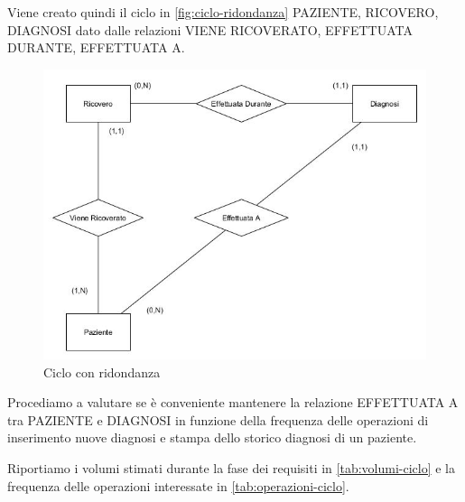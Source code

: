 \documentclass{article}
\begin{document}
Viene creato quindi il ciclo in \autoref{fig:ciclo-ridondanza} PAZIENTE, RICOVERO, DIAGNOSI dato dalle relazioni VIENE RICOVERATO, EFFETTUATA DURANTE, EFFETTUATA A.

\begin{figure}[H] %
      \centering
      \includegraphics[width=\linewidth]{schema3.jpg}
      \caption{Ciclo con ridondanza}
      \label{fig:ciclo-ridondanza}
    \end{figure}
Procediamo a valutare se è conveniente mantenere la relazione EFFETTUATA A tra PAZIENTE e DIAGNOSI in funzione della frequenza delle operazioni di inserimento nuove diagnosi e stampa dello storico diagnosi di un paziente.


Riportiamo i volumi stimati durante la fase dei requisiti in \autoref{tab:volumi-ciclo} e la frequenza delle operazioni interessate in \autoref{tab:operazioni-ciclo}.
\end{document}
